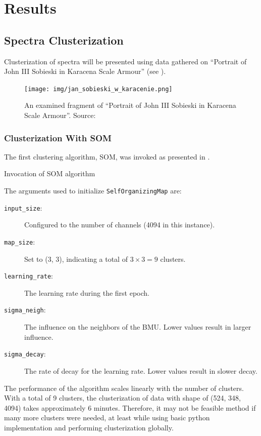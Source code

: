 \section{Results}
\subsection{Spectra Clusterization}
Clusterization of spectra will be presented using data gathered on ``Portrait of John III Sobieski in Karacena Scale Armour'' (see ).
\begin{figure}[H] 
  \centering     
  \texttt{[image: img/jan\_sobieski\_w\_karacenie.png]} 
  \caption{An examined fragment of ``Portrait of John III Sobieski in Karacena Scale Armour''. Source: \cite{wikimediaSobieskiPortrai} }
  \label{fig:sobieski_fragment}
\end{figure}

\subsubsection{Clusterization With SOM}
The first clustering algorithm, SOM, was invoked as presented in .
\newenvironment{longlistingG}{\captionsetup{type=listing, width=0.8\textwidth}}{}
\begin{longlistingG}
    \caption{Invocation of SOM algorithm}
    \label{lst:som-invocation}
\end{longlistingG}
\vspace{12pt}

The arguments used to initialize \texttt{SelfOrganizingMap} are:
\begin{description}
    \item[\texttt{input\_size}:] Configured to the number of channels (4094 in this instance).
    \item[\texttt{map\_size}:] Set to (3, 3), indicating a total of $3 \times 3 = 9$ clusters.
    \item[\texttt{learning\_rate}:] The learning rate during the first epoch.
    \item[\texttt{sigma\_neigh}:] The influence on the neighbors of the BMU. Lower values result in larger influence.
    \item[\texttt{sigma\_decay}:] The rate of decay for the learning rate. Lower values result in slower decay.
\end{description}
The performance of the algorithm scales linearly with the number of clusters. 
With a total of 9 clusters, the clusterization of data with shape of (524, 348, 4094) takes approximately 6 minutes. 
Therefore, it may not be feasible method if many more clusters were needed, at least while using basic python implementation and performing clusterization globally.

